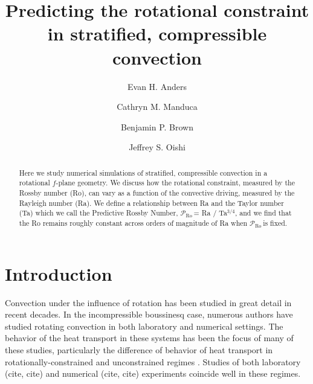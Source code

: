 \documentclass[twocolumn, amsmath, amsfonts, amssymb]{aastex62}
\newcommand{\pro}{\ensuremath{\mathcal{P}_{\text{Ro}}\,}}
\begin{document}
\newcommand{\AB}{\citetalias{anders&brown2017}}

\title{Predicting the rotational constraint in stratified, compressible convection}


\author{Evan H. Anders}
\author{Cathryn M. Manduca}
\author{Benjamin P. Brown}
\author{Jeffrey S. Oishi}


\begin{abstract}
Here we study numerical simulations of stratified, compressible convection in a
rotational $f$-plane geometry. We discuss how the rotational constraint,
measured by the Rossby number (Ro), can vary as a function of the convective driving,
measured by the Rayleigh number (Ra). We define a relationship between Ra and the
Taylor number (Ta) which we call the Predictive Rossby Number, 
\pro = Ra / Ta$^{3/4}$, and we find that the Ro remains roughly constant
across orders of magnitude of Ra when \pro is fixed. 
\end{abstract}


\section{Introduction}
\label{sec:intro}
Convection under the influence of rotation has been studied in great detail in
recent decades. In the incompressible boussinesq case, numerous authors have
studied rotating convection in both laboratory and numerical settings. The
behavior of the heat transport in these systems has been the focus of many
of these studies, particularly the difference of behavior of heat transport
in rotationally-constrained and unconstrained regimes 
\citep{king&all2009, zhong&all2009, stevens&all2009, julien&all2012}. 
Studies of both laboratory (cite, cite) and numerical (cite, cite) experiments
coincide well in these regimes.
\end{document}
